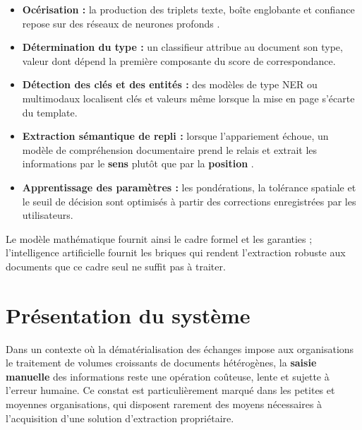 \begin{itemize}
    \item[\opmanicule] \textbf{Océrisation :} la production des triplets texte, boîte
    englobante et confiance repose sur des réseaux de neurones profonds
    \cite{smith2007tesseract, du2022ppocr}.

    \item[\opmanicule] \textbf{Détermination du type :} un classifieur attribue au document
    son type, valeur dont dépend la première composante du score de correspondance.

    \item[\opmanicule] \textbf{Détection des clés et des entités :} des modèles de type NER ou
    multimodaux \cite{xu2020layoutlm, huang2022layoutlmv3} localisent clés et valeurs même
    lorsque la mise en page s'écarte du template.

    \item[\opmanicule] \textbf{Extraction sémantique de repli :} lorsque l'appariement échoue,
    un modèle de compréhension documentaire prend le relais et extrait les informations par le
    \textbf{sens} plutôt que par la \textbf{position} \cite{devlin2019bert}.

    \item[\opmanicule] \textbf{Apprentissage des paramètres :} les pondérations, la tolérance
    spatiale et le seuil de décision sont optimisés à partir des corrections enregistrées par
    les utilisateurs.
\end{itemize}

Le modèle mathématique fournit ainsi le cadre formel et les garanties ; l'intelligence
artificielle fournit les briques qui rendent l'extraction robuste aux documents que ce cadre
seul ne suffit pas à traiter.

\section{Présentation du système}
\label{sec:presentation-systeme}

Dans un contexte où la dématérialisation des échanges impose aux organisations le traitement
de volumes croissants de documents hétérogènes, la \textbf{saisie manuelle} des informations
reste une opération coûteuse, lente et sujette à l'erreur humaine. Ce constat est
particulièrement marqué dans les petites et moyennes organisations, qui disposent rarement
des moyens nécessaires à l'acquisition d'une solution d'extraction propriétaire.

